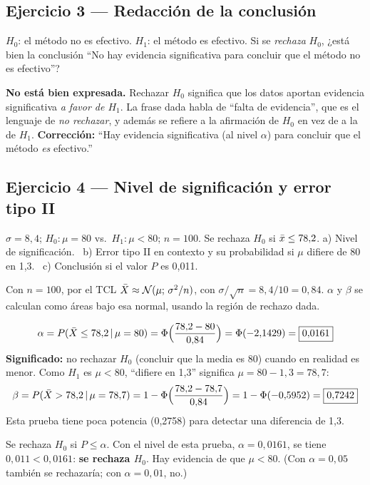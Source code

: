 \subsection{Ejercicio 3 --- Redacción de la conclusión}
\begin{enun}
$H_0$: el método no es efectivo. $H_1$: el método es efectivo. Si se \emph{rechaza} $H_0$, ¿está bien la conclusión ``No hay evidencia significativa para concluir que el método no es efectivo''?
\end{enun}
\begin{resp}
\textbf{No está bien expresada.} Rechazar $H_0$ significa que los datos aportan evidencia significativa \emph{a favor de $H_1$}. La frase dada habla de ``falta de evidencia'', que es el lenguaje de \emph{no rechazar}, y además se refiere a la afirmación de $H_0$ en vez de a la de $H_1$.
\textbf{Corrección:} ``Hay evidencia significativa (al nivel $\alpha$) para concluir que el método \emph{es} efectivo.''
\end{resp}

\subsection{Ejercicio 4 --- Nivel de significación y error tipo II}
\begin{enun}
$\sigma=8{,}4$; $H_0:\mu=80$ vs.\ $H_1:\mu<80$; $n=100$. Se rechaza $H_0$ si $\bar{x}\le78{,}2$.
a) Nivel de significación. \ b) Error tipo II en contexto y su probabilidad si $\mu$ difiere de 80 en 1,3. \ c) Conclusión si el valor $P$ es 0,011.
\end{enun}
\begin{metodo}
Con $n=100$, por el TCL $\bar{X}\approx\mathcal{N}(\mu;\,\sigma^2/n)$, con $\sigma/\sqrt n=8{,}4/10=0{,}84$. $\alpha$ y $\beta$ se calculan como áreas bajo esa normal, usando la región de rechazo dada.
\end{metodo}
\[
\alpha=P(\bar{X}\le78{,}2\,|\,\mu=80)=\Phi\Big(\frac{78{,}2-80}{0{,}84}\Big)=\Phi(-2{,}1429)=\boxed{0{,}0161}
\]
\textbf{Significado:} no rechazar $H_0$ (concluir que la media es 80) cuando en realidad es menor.
Como $H_1$ es $\mu<80$, ``difiere en 1,3'' significa $\mu=80-1{,}3=78{,}7$:
\[
\beta=P(\bar{X}>78{,}2\,|\,\mu=78{,}7)=1-\Phi\Big(\frac{78{,}2-78{,}7}{0{,}84}\Big)=1-\Phi(-0{,}5952)=\boxed{0{,}7242}
\]
Esta prueba tiene poca potencia (0,2758) para detectar una diferencia de 1,3.

Se rechaza $H_0$ si $P\le\alpha$. Con el nivel de esta prueba, $\alpha=0{,}0161$, se tiene $0{,}011<0{,}0161$: \textbf{se rechaza $H_0$}. Hay evidencia de que $\mu<80$. (Con $\alpha=0{,}05$ también se rechazaría; con $\alpha=0{,}01$, no.)

